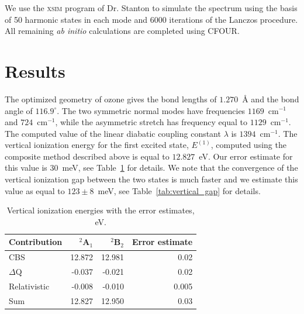 \documentclass[12pt,pra,aps,superscriptaddress]{revtex4-2}
\begin{document}
We use the \textsc{xsim} program of Dr. Stanton to simulate the spectrum using
the basis of 50 harmonic states in each mode and 6000 iterations of the
Lanczos procedure. All remaining \emph{ab initio} calculations are completed
using \textsc{CFOUR}.~\cite{cfour, cfour:2020}


\section{Results}


The optimized geometry of ozone gives the bond lengths of $1.270$~\AA{} and
the bond angle of $116.9^\circ$. The two symmetric normal modes have
frequencies $1169$~cm$^{-1}$ and $724$~cm$^{-1}$, while the asymmetric stretch
has frequency equal to $1129$~cm$^{-1}$. The computed value of the linear
diabatic coupling constant $\lambda$ is $1394$~cm$^{-1}$. The vertical
ionization energy for the first excited state, $E^{(1)}$, computed using the
composite method described above is equal to $12.827$~eV. Our error estimate
for this value is $30$~meV, see Table~\ref{tab:vertical_ionization_energy} for
details.  We note that the convergence of the vertical ionization gap between
the two states is much faster and we estimate this value as equal to
$123\pm8$~meV, see Table~\ref{tab:vertical_gap} for details. 

\begin{table}
    \caption{
        Vertical ionization energies with the error estimates, eV.
    }
    \label{tab:vertical_ionization_energy}
    \begin{center}
        \begin{tabular}[c]{|l|rr|r|}
            \hline
            Contribution  & $^2$A$_1$ & $^2$B$_2$ & Error estimate \\ \hline
            CBS           & 12.872    & 12.981    & 0.02 \\
            $\Delta$Q     & -0.037    & -0.021    & 0.02 \\
            Relativistic  & -0.008    & -0.010    & 0.005 \\ \hline
            Sum           & 12.827    & 12.950    & 0.03 \\ \hline
        \end{tabular}
    \end{center}
\end{table}
\end{document}
